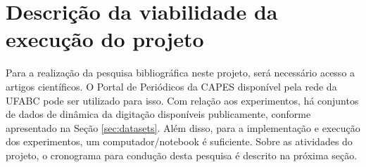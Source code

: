 \section{Descrição da viabilidade da execução do projeto}
\label{sec:viabilidade}

Para a realização da pesquisa bibliográfica neste projeto, será necessário acesso a artigos científicos. O Portal de Periódicos da CAPES disponível pela rede da UFABC pode ser utilizado para isso. Com relação aos experimentos, há conjuntos de dados de dinâmica da digitação disponíveis publicamente, conforme apresentado na Seção \ref{sec:datasets}. Além disso, para a implementação e execução dos experimentos, um computador/notebook é suficiente. Sobre as atividades do projeto, o cronograma para condução desta pesquisa é descrito na próxima seção.

\newpage